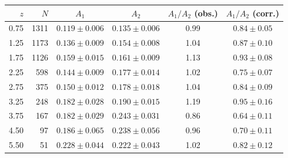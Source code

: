 \begin{tabular}{rrcccc}
\toprule
$z$ & $N$ & $A_1$ & $A_2$ & $A_1/A_2$ (obs.) & $A_1/A_2$ (corr.)\\
\midrule
0.75 & 1311 & $0.119\pm0.006$ & $0.135\pm0.006$ & 0.99 & $0.84\pm0.05$\\
1.25 & 1173 & $0.136\pm0.009$ & $0.154\pm0.008$ & 1.04 & $0.87\pm0.10$\\
1.75 & 1126 & $0.159\pm0.015$ & $0.161\pm0.009$ & 1.13 & $0.93\pm0.08$\\
2.25 & 598 & $0.144\pm0.009$ & $0.177\pm0.014$ & 1.02 & $0.75\pm0.07$\\
2.75 & 375 & $0.150\pm0.012$ & $0.178\pm0.018$ & 1.04 & $0.84\pm0.09$\\
3.25 & 248 & $0.182\pm0.028$ & $0.190\pm0.015$ & 1.19 & $0.95\pm0.16$\\
3.75 & 167 & $0.182\pm0.029$ & $0.243\pm0.031$ & 0.86 & $0.64\pm0.11$\\
4.50 & 97 & $0.186\pm0.065$ & $0.238\pm0.056$ & 0.96 & $0.70\pm0.11$\\
5.50 & 51 & $0.228\pm0.044$ & $0.222\pm0.043$ & 1.02 & $0.82\pm0.12$\\
\bottomrule
\end{tabular}
